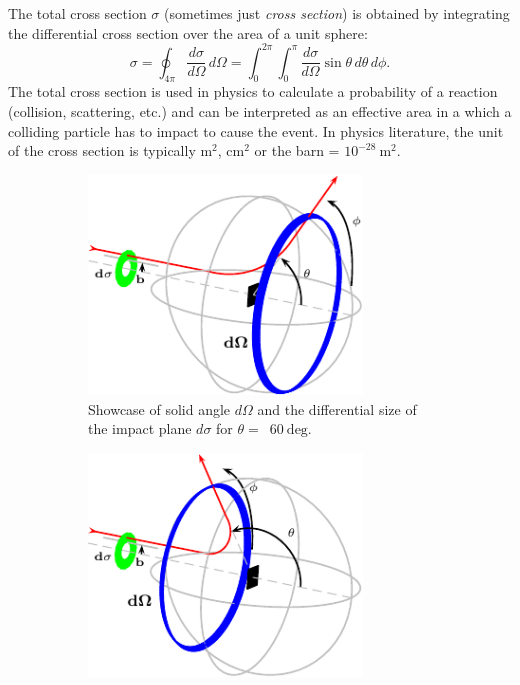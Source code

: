 \documentclass[a4paper,11pt,titlepage,twoside]{article}
\newcommand{\unit}[2]{$#1~\ensuremath{\mathrm{#2}}$}
\begin{document}
The total cross section $\sigma$ (sometimes just \emph{cross section}) is obtained by integrating the differential cross section over the area of a unit sphere:
\begin{equation}
  \sigma = \oint_{4\pi} \frac{d\sigma}{d\Omega}\,d\Omega = \int_0^{2\pi} \int_0^{\pi} \frac{d\sigma}{d\Omega}\sin\theta\,d\theta\,d\phi.
\end{equation}
The total cross section is used in physics to calculate a probability of a reaction (collision, scattering, etc.) and can be interpreted as an effective area in a which a colliding particle has to impact to cause the event.
In physics literature, the unit of the cross section is typically $\mathrm{m}^2$, $\mathrm{cm}^2$ or the barn = \unit{10^{-28}}{m^2}.

\begin{figure}[ht]
  \centering
  \begin{subfigure}{0.49\textwidth}
    \centering
    \includegraphics[width=0.8\textwidth]{./fig/compton_scattering_illustration_1.pdf}
    \caption{Showcase of solid angle $d\Omega$ and the differential size of the impact plane $d\sigma$ for $\theta=$~\unit{60}{deg}.}
    \label{fig:differential_cross_section_1}
  \end{subfigure}
  \begin{subfigure}{0.49\textwidth}
    \centering
    \includegraphics[width=0.8\textwidth]{./fig/compton_scattering_illustration_2.pdf}

\end{subfigure}
\end{figure}
\end{document}
